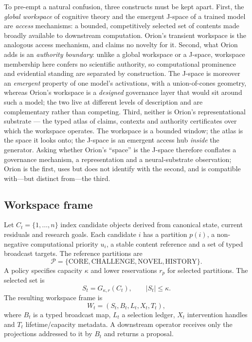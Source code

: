 To pre-empt a natural confusion, three constructs must be kept apart. First, the \emph{global workspace} of cognitive theory and the emergent J-space of a trained model are \emph{access} mechanisms: a bounded, competitively selected set of contents made broadly available to downstream computation. Orion's transient workspace is the analogous access mechanism, and claims no novelty for it. Second, what Orion adds is an \emph{authority boundary}: unlike a global workspace or a J-space, workspace membership here confers no scientific authority, so computational prominence and evidential standing are separated by construction. The J-space is moreover an \emph{emergent} property of one model's activations, with a union-of-cones geometry, whereas Orion's workspace is a \emph{designed} governance layer that would sit around such a model; the two live at different levels of description and are complementary rather than competing. Third, neither is Orion's representational substrate --- the typed atlas of claims, contexts and authority certificates over which the workspace operates. The workspace is a bounded window; the atlas is the space it looks onto; the J-space is an emergent access hub \emph{inside} the generator. Asking whether Orion's ``space'' is the J-space therefore conflates a governance mechanism, a representation and a neural-substrate observation; Orion is the first, uses but does not identify with the second, and is compatible with---but distinct from---the third.

\subsection{Workspace frame}

Let \(C_t=\{1,\ldots,n\}\) index candidate objects derived from canonical state, current residuals and research goals. Each candidate \(i\) has a partition \(p(i)\), a non-negative computational priority \(u_i\), a stable content reference and a set of typed broadcast targets. The reference partitions are
\[
\mathcal P=\{\mathrm{CORE},\mathrm{CHALLENGE},\mathrm{NOVEL},\mathrm{HISTORY}\}.
\]
A policy specifies capacity \(\kappa\) and lower reservations \(r_p\) for selected partitions. The selected set is
\[
S_t=G_{\kappa,r}(C_t),\qquad |S_t|\le \kappa.
\]
The resulting workspace frame is
\[
W_t=(S_t,B_t,L_t,X_t,T_t),
\]
where \(B_t\) is a typed broadcast map, \(L_t\) a selection ledger, \(X_t\) intervention handles and \(T_t\) lifetime/capacity metadata. A downstream operator receives only the projections addressed to it by \(B_t\) and returns a proposal.


